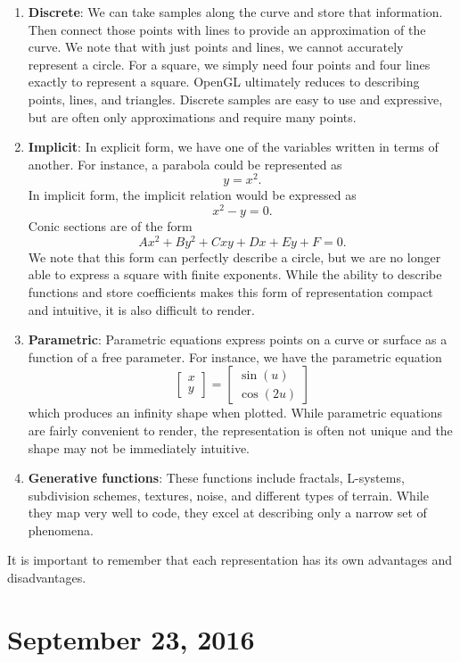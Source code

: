 \documentclass[11pt]{article}
\theoremstyle{plain} %
\theoremstyle{definition}
\theoremstyle{example}
\theoremstyle{remark}
\begin{document}
\begin{enumerate}
	\item \textbf{Discrete}: We can take samples along the curve and store that information. Then connect those points with lines to provide an approximation of the curve. We note that with just points and lines, we cannot accurately represent a circle. For a square, we simply need four points and four lines exactly to represent a square. OpenGL ultimately reduces to describing points, lines, and triangles. Discrete samples are easy to use and expressive, but are often only approximations and require many points.
	\item \textbf{Implicit}: In explicit form, we have one of the variables written in terms of another. For instance, a parabola could be represented as $$y = x^2.$$ In implicit form, the implicit relation would be expressed as $$x^2-y=0.$$ Conic sections are of the form $$Ax^2 + By^2+ Cxy + Dx + Ey + F = 0.$$ We note that this form can perfectly describe a circle, but we are no longer able to express a square with finite exponents. While the ability to describe functions and store coefficients makes this form of representation compact and intuitive, it is also difficult to render. 
	\item \textbf{Parametric}: Parametric equations express points on a curve or surface as a function of a free parameter. For instance, we have the parametric equation $$\begin{bmatrix}x \\ y\end{bmatrix} = \begin{bmatrix}\sin( u) \\ \cos(2u)\end{bmatrix}$$ which produces an infinity shape when plotted. While parametric equations are fairly convenient to render, the representation is often not unique and the shape may not be immediately intuitive. 
	\item \textbf{Generative functions}: These functions include fractals, L-systems, subdivision schemes, textures, noise, and different types of terrain. While they map very well to code, they excel at describing only a narrow set of phenomena. 
\end{enumerate}

It is important to remember that each representation has its own advantages and disadvantages. 

\section{September 23, 2016}
\end{document}
